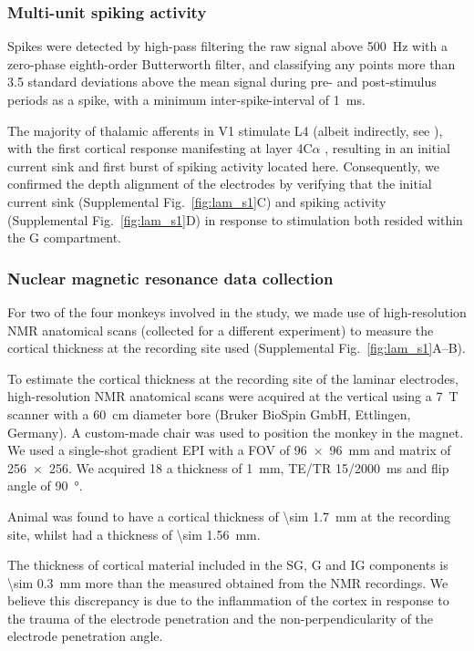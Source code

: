 \subsubsection{Multi-unit spiking activity}

Spikes were detected by high-pass filtering the raw signal above \SI{500}{Hz} with a zero-phase eighth-order Butterworth filter, and classifying any points more than 3.5 standard deviations above the mean signal during pre- and post-stimulus periods as a spike, with a minimum inter-spike-interval of \SI{1}{\milli\second}.

The majority of thalamic afferents in \ac{V1} stimulate \ac{L4} (albeit indirectly, see \citealp{Hansen2012}), with the first cortical response manifesting at layer 4C$\alpha$ \citep{Callaway1998}, resulting in an initial current sink and first burst of spiking activity located here.
Consequently, we confirmed the depth alignment of the electrodes by verifying that the initial current sink (Supplemental Fig.~\ref{fig:lam_s1}C) and spiking activity (Supplemental Fig.~\ref{fig:lam_s1}D) in response to stimulation both resided within the \ac{G} compartment.

\subsubsection{Nuclear magnetic resonance data collection}

For two of the four monkeys involved in the study, we made use of high-resolution \ac{NMR} anatomical scans (collected for a different experiment) to measure the cortical thickness at the recording site used (Supplemental Fig.~\ref{fig:lam_s1}A--B).

To estimate the cortical thickness at the recording site of the laminar electrodes, high-resolution \ac{NMR} anatomical scans were acquired at the vertical using a \SI{7}{T} scanner with a \SI{60}{\centi\metre} diameter bore (Bruker BioSpin GmbH, Ettlingen, Germany).
A custom-made chair was used to position the monkey in the magnet.
We used a single-shot gradient \ac{EPI} with a \ac{FOV} of \SI{96x96}{\milli\metre} and matrix of \num{256x256}.
We acquired 18 a thickness of \SI{1}{\milli\metre}, TE/TR 15/\SI{2000}{\milli\second} and flip angle of \SI{90}{\degree}.

Animal  was found to have a cortical thickness of \SI{\sim 1.7}{mm} at the recording site, whilst  had a thickness of \SI{\sim 1.56}{mm}.

The thickness of cortical material included in the \ac{SG}, \ac{G} and \ac{IG} components is \SI{\sim 0.3}{mm} more than the measured obtained from the \ac{NMR} recordings.
We believe this discrepancy is due to the inflammation of the cortex in response to the trauma of the electrode penetration and the non-perpendicularity of the electrode penetration angle.


